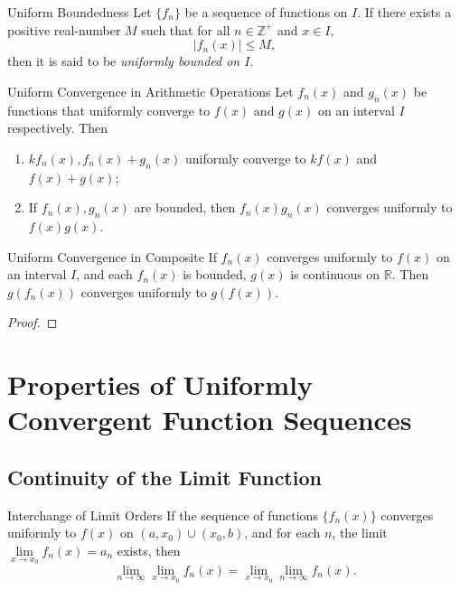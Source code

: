 \begin{definition}{Uniform Boundedness}{}
  Let $\{f_n\}$ be a sequence of functions on $I$.
  If there exists a positive real-number $M$ such that for all $n \in \mathbb{Z}^+$ and $x \in I$,
  \begin{equation}
    |f_n(x)| \leq M,
  \end{equation}
  then it is said to be \emph{uniformly bounded on $I$}.
\end{definition}

\begin{proposition}{Uniform Convergence in Arithmetic Operations}{}
  Let $f_n(x)$ and $g_n(x)$ be functions that uniformly converge
  to $f(x)$ and $g(x)$ on an interval $I$ respectively. Then
  \begin{enumerate}
  \item $kf_n(x), f_n(x) + g_n(x)$ uniformly converge to $kf(x)$ and $f(x) + g(x)$;
  \item If $f_n(x),g_n(x)$ are bounded, then $f_n(x)g_n(x)$ converges uniformly
    to $f(x)g(x)$.
  \end{enumerate}
\end{proposition}

\begin{proposition}{Uniform Convergence in Composite}{}
  If $f_n(x)$ converges uniformly to $f(x)$ on an interval $I$,
  and each $f_n(x)$ is bounded, $g(x)$ is continuous on $\mathbb{R}$.
  Then $g(f_n(x))$ converges uniformly to $g(f(x))$.
\end{proposition}

\begin{proof}
  
\end{proof}

\section{Properties of Uniformly Convergent Function Sequences}

\subsection{Continuity of the Limit Function}

\begin{theorem}{Interchange of Limit Orders}{}
  If the sequence of functions $\{f_n(x)\}$ converges uniformly to $f(x)$
  on $(a, x_0) \cup (x_0, b)$,
  and for each $n$, the limit $\lim \limits _{x \rightarrow x_0} f_n(x) = a_n$
  exists,
  then
  \begin{equation}
    \lim \limits _{n \rightarrow \infty} \lim \limits _{x \rightarrow x_0} f_n(x) = 
    \lim \limits _{x \rightarrow x_0} \lim \limits _{n \rightarrow \infty} f_n(x).
  \end{equation}
\end{theorem}

